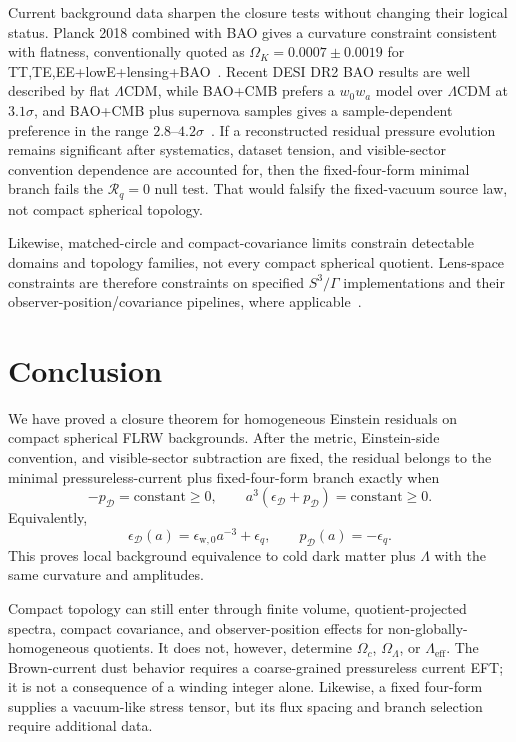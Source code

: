 \documentclass[
  aps,
  prd,
  reprint,
  superscriptaddress,
  floatfix,
  nofootinbib,
  longbibliography
]{revtex4-2}
\theoremstyle{plain}
\theoremstyle{definition}
\theoremstyle{remark}
\newcommand{\D}{\mathcal D}
\newcommand{\wind}{\mathrm w}
\newcommand{\eff}{\mathrm{eff}}
\newcommand{\Rcl}{\mathcal R}
\newcommand{\eps}{\epsilon}
\begin{document}
Current background data sharpen the closure tests without changing their
logical status.  Planck 2018 combined with BAO gives a curvature constraint
consistent with flatness, conventionally quoted as
\(\Omega_K=0.0007\pm0.0019\) for TT,TE,EE+lowE+lensing+BAO~\cite{Planck2018}.
Recent DESI DR2 BAO results are well described by flat \(\Lambda\)CDM, while
BAO+CMB prefers a \(w_0w_a\) model over \(\Lambda\)CDM at \(3.1\sigma\), and
BAO+CMB plus supernova samples gives a sample-dependent preference in the range
\(2.8\)--\(4.2\sigma\)~\cite{DESIDR2}.  If a reconstructed residual
pressure evolution remains significant after systematics, dataset tension, and
visible-sector convention dependence are accounted for, then the fixed-four-form
minimal branch fails the
\(\Rcl_q=0\) null test.  That would falsify the fixed-vacuum source law,
not compact spherical topology.

Likewise, matched-circle and compact-covariance limits constrain detectable
domains and topology families, not every compact spherical quotient.
Lens-space constraints are therefore constraints on specified \(S^3/\Gamma\)
implementations and their observer-position/covariance pipelines, where
applicable~\cite{Cornish,PlanckTopology,SahaLens}.

\section{Conclusion}

We have proved a closure theorem for homogeneous Einstein residuals on compact
spherical FLRW backgrounds.  After the metric, Einstein-side convention, and
visible-sector subtraction are fixed, the residual belongs to the minimal
pressureless-current plus fixed-four-form branch exactly when
\begin{equation}
-p_\D=\text{constant}\ge0,
\qquad
a^3(\eps_\D+p_\D)=\text{constant}\ge0 .
\end{equation}
Equivalently,
\begin{equation}
\eps_\D(a)=\eps_{\wind,0}a^{-3}+\eps_q,
\qquad
p_\D(a)=-\eps_q .
\end{equation}
This proves local background equivalence to cold dark matter plus \(\Lambda\)
with the same curvature and amplitudes.

Compact topology can still enter through finite volume, quotient-projected
spectra, compact covariance, and observer-position effects for
non-globally-homogeneous quotients.  It does
not, however, determine \(\Omega_c\), \(\Omega_\Lambda\), or
\(\Lambda_{\eff}\).  The Brown-current dust behavior requires a coarse-grained
pressureless current EFT; it is not a consequence of a winding integer alone.
Likewise, a fixed four-form supplies a vacuum-like stress tensor, but its flux
spacing and branch selection require additional data.
\end{document}
